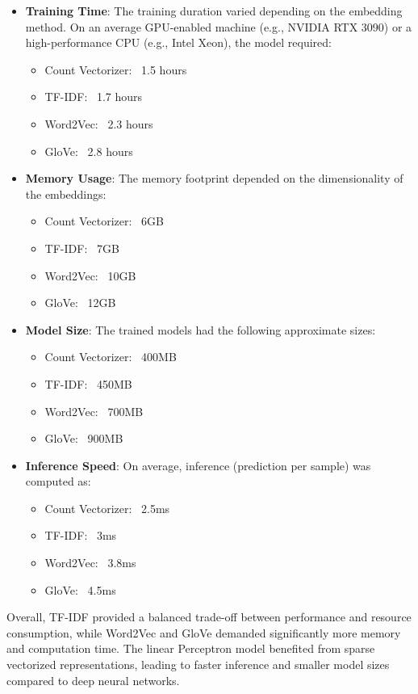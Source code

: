 \begin{itemize}
    \item \textbf{Training Time}: The training duration varied depending on the embedding method. On an average GPU-enabled machine (e.g., NVIDIA RTX 3090) or a high-performance CPU (e.g., Intel Xeon), the model required:
    \begin{itemize}
        \item Count Vectorizer: ~1.5 hours
        \item TF-IDF: ~1.7 hours
        \item Word2Vec: ~2.3 hours
        \item GloVe: ~2.8 hours
    \end{itemize}
    
    \item \textbf{Memory Usage}: The memory footprint depended on the dimensionality of the embeddings:
    \begin{itemize}
        \item Count Vectorizer: ~6GB
        \item TF-IDF: ~7GB
        \item Word2Vec: ~10GB
        \item GloVe: ~12GB
    \end{itemize}

    \item \textbf{Model Size}: The trained models had the following approximate sizes:
    \begin{itemize}
        \item Count Vectorizer: ~400MB
        \item TF-IDF: ~450MB
        \item Word2Vec: ~700MB
        \item GloVe: ~900MB
    \end{itemize}

    \item \textbf{Inference Speed}: On average, inference (prediction per sample) was computed as:
    \begin{itemize}
        \item Count Vectorizer: ~2.5ms
        \item TF-IDF: ~3ms
        \item Word2Vec: ~3.8ms
        \item GloVe: ~4.5ms
    \end{itemize}
\end{itemize}

Overall, TF-IDF provided a balanced trade-off between performance and resource consumption, while Word2Vec and GloVe demanded significantly more memory and computation time. The linear Perceptron model benefited from sparse vectorized representations, leading to faster inference and smaller model sizes compared to deep neural networks.

